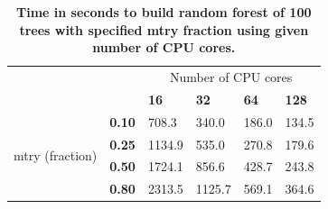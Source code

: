 \documentclass[10pt,a4paper]{article}  %
\begin{document}
\begin{table}[!ht]
\centering
\caption{
{\bf Time in seconds to build random forest of 100
  trees with specified mtry fraction using given number of CPU cores.}}
\begin{tabular}{|l|l||l|l|l|l|}
\hline
\multicolumn{2}{|l||}{\multirow{2}{*}{}}                   & \multicolumn{4}{|c|}{Number of CPU cores}  \\
\cline{3-6}
\multicolumn{2}{|l||}{}                                               & \bf{16} & \bf{32}      & \bf{64}      & \bf{128}  \\
\hline
\multirow{4}{*}{mtry (fraction)}                            & \bf{0.10} & 708.3  & 340.0  & 186.0 & 134.5 \\
                                                            & \bf{0.25} & 1134.9 & 535.0  & 270.8 & 179.6 \\
                                                            & \bf{0.50} & 1724.1 & 856.6  & 428.7 & 243.8 \\
                                                            & \bf{0.80} & 2313.5 & 1125.7 & 569.1 & 364.6 \\

\hline
\end{tabular}
\begin{flushleft} 
\end{flushleft}
\label{table10}
\end{table}
\end{document}
